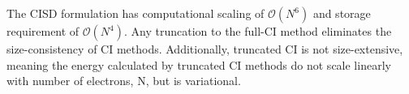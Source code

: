       The CISD formulation has computational scaling of $\mathcal{O}(N^6)$ and storage requirement of $\mathcal{O}(N^4)$.  Any truncation to the full-CI method eliminates the size-consistency of CI methods.  Additionally, truncated CI is not size-extensive, meaning the energy calculated by truncated CI methods do not scale linearly with number of electrons, N, but is variational.


